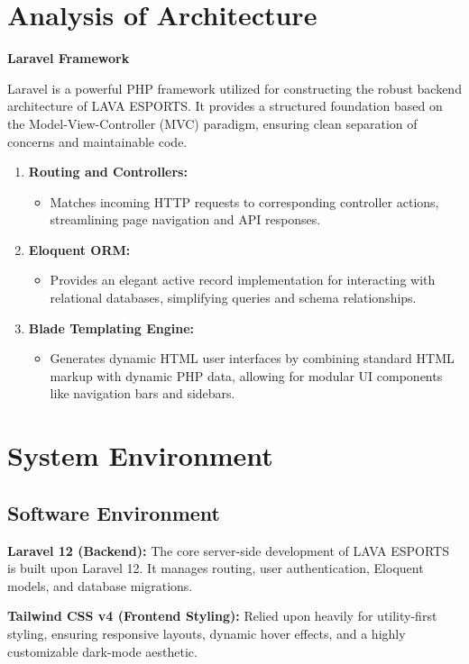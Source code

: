 \newpage
 \section{Analysis of Architecture}
{\large \textbf{Laravel Framework}}

Laravel is a powerful PHP framework utilized for constructing the robust backend architecture of LAVA ESPORTS. It provides a structured foundation based on the Model-View-Controller (MVC) paradigm, ensuring clean separation of concerns and maintainable code.
\begin{enumerate}
    \item \textbf{Routing and Controllers:}
    \begin{itemize}
        \item Matches incoming HTTP requests to corresponding controller actions, streamlining page navigation and API responses.
    \end{itemize}
    \item \textbf{Eloquent ORM:}
    \begin{itemize}
        \item Provides an elegant active record implementation for interacting with relational databases, simplifying queries and schema relationships.
    \end{itemize}
    \item \textbf{Blade Templating Engine:}
    \begin{itemize}
        \item Generates dynamic HTML user interfaces by combining standard HTML markup with dynamic PHP data, allowing for modular UI components like navigation bars and sidebars.
    \end{itemize}
\end{enumerate}

\section{System Environment}
 
 \subsection{Software Environment}
 \textbf{Laravel 12 (Backend):}
 The core server-side development of LAVA ESPORTS is built upon Laravel 12. It manages routing, user authentication, Eloquent models, and database migrations.
 
 \textbf{Tailwind CSS v4 (Frontend Styling):}
 Relied upon heavily for utility-first styling, ensuring responsive layouts, dynamic hover effects, and a highly customizable dark-mode aesthetic.
 
